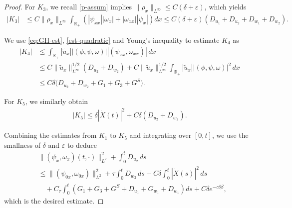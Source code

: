 \documentclass[10pt,a4paper]{amsart}
\begin{document}
\begin{proof}
For $K_3$, we recall \eqref{p-assum} implies $\|\rho_x\|_{L^\infty} \le C(\delta + \varepsilon)$, which yields
\begin{equation*}
\begin{aligned}
|K_3| &\le C \|\rho_x\|_{L^\infty} \int_{\mathbb{R}_+} \left( |\psi_{xx}||\omega_x| + |\omega_{xx}||\psi_x| \right) dx\le C (\delta + \varepsilon) \left( D_{u_1}+ D_{u_2} + D_{w_1} + D_{w_2} \right).
\end{aligned}
\end{equation*}

We use \eqref{eq:GH-est}, \eqref{est-quadratic} and Young's inequality to estimate $K_4$ as
\begin{equation*}
\begin{aligned}
|K_4| &\le \int_{\mathbb{R}_+}  |\tilde{u}_x| |(\phi,\psi,\omega)| |(\psi_{xx},\omega_{xx})| \, dx \\
&\le C\|\tilde{u}_x\|_{L^\infty}^{1/2} ( D_{u_2} +  D_{w_2} )+ C \|\tilde{u}_x\|_{L^\infty}^{1/2} \int_{\mathbb{R}_+} |\tilde{u}_x| |(\phi,\psi,\omega)|^2 \, dx \\
&\le C \delta \bigl(D_{u_2}+D_{w_2} +G_1+G_3 + G^S \bigr).
\end{aligned}
\end{equation*}

For $K_5$, we similarly obtain
\begin{equation*}
\begin{aligned}
|K_5| \le \delta |\dot{X}(t)|^2 + C \delta (D_{u_2} + D_{w_2} ).
\end{aligned}
\end{equation*}



Combining the estimates from $K_1$ to $K_5$ and integrating over $[0,t]$, we use the smallness of $\delta$ and $\varepsilon$ to deduce
\begin{equation*}
\begin{aligned}
&\|(\psi_x, \omega_x)(t,\cdot)\|_{L^2}^2 + \int_0^t D_{u_2} \,ds \\
&\le  \|(\psi_{0x}, \omega_{0x})\|_{L^2}^2 + \tau \int_0^t D_{w_2} \,ds + C\delta \int_0^t |\dot{X}(s)|^2 \,ds \\
&\quad + C_\tau \int_0^t \left(G_1 + G_3 + G^S+ D_{u_1} + G_{w_1} + D_{w_1}   \right) ds + C \delta e^{-c\delta \beta},
\end{aligned}
\end{equation*}
which is the desired estimate.

\end{proof}
\end{document}
